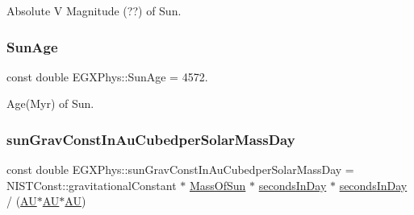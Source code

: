 Absolute V Magnitude (??) of Sun. \mbox{\label{namespace_e_g_x_phys_a173216c099d7915fb16e6416902fcbb8}} 
\subsubsection{\texorpdfstring{Sun\+Age}{SunAge}}
{\footnotesize\ttfamily const double E\+G\+X\+Phys\+::\+Sun\+Age = 4572.}

Age(\+Myr) of Sun. \mbox{\label{namespace_e_g_x_phys_ad6c3d6fda98ef1efd005dd096890e981}} 
\subsubsection{\texorpdfstring{sun\+Grav\+Const\+In\+Au\+Cubedper\+Solar\+Mass\+Day}{sunGravConstInAuCubedperSolarMassDay}}
{\footnotesize\ttfamily const double E\+G\+X\+Phys\+::sun\+Grav\+Const\+In\+Au\+Cubedper\+Solar\+Mass\+Day = N\+I\+S\+T\+Const\+::gravitational\+Constant $\ast$ \mbox{\hyperlink{namespace_e_g_x_phys_a6e84ae13f1dbcecb215af787bbc12cd6}{Mass\+Of\+Sun}} $\ast$ \mbox{\hyperlink{namespace_e_g_x_phys_ab4f86327f64403b843077ecc189ce52b}{seconds\+In\+Day}} $\ast$ \mbox{\hyperlink{namespace_e_g_x_phys_ab4f86327f64403b843077ecc189ce52b}{seconds\+In\+Day}} / (\mbox{\hyperlink{namespace_e_g_x_phys_a999332303a2214425184fbe23dbae0c5}{AU}}$\ast$\mbox{\hyperlink{namespace_e_g_x_phys_a999332303a2214425184fbe23dbae0c5}{AU}}$\ast$\mbox{\hyperlink{namespace_e_g_x_phys_a999332303a2214425184fbe23dbae0c5}{AU}})}

